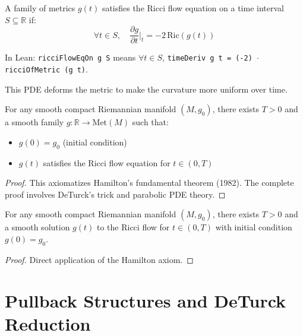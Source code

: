 \begin{definition}
\label{def:ricci_flow_eq_on}
\leanok
{}
A family of metrics $g(t)$ satisfies the Ricci flow equation on a time interval $S \subseteq \mathbb{R}$ if:
\[ \forall t \in S, \quad \frac{\partial g}{\partial t}\Big|_t = -2 \, \mathrm{Ric}(g(t)) \]

In Lean: \texttt{ricciFlowEqOn g S} means $\forall t \in S$, \texttt{timeDeriv g t = (-2) $\cdot$ ricciOfMetric (g t)}.

This PDE deforms the metric to make the curvature more uniform over time.
\end{definition}

\begin{theorem}
\label{axiom:hamilton_ste}
For any smooth compact Riemannian manifold $(M, g_0)$, there exists $T > 0$ and a smooth family $g : \mathbb{R} \to \mathrm{Met}(M)$ such that:
\begin{itemize}
\item $g(0) = g_0$ (initial condition)
\item $g(t)$ satisfies the Ricci flow equation for $t \in (0, T)$
\end{itemize}
\end{theorem}

\begin{proof}
This axiomatizes Hamilton's fundamental theorem (1982). The complete proof involves DeTurck's trick and parabolic PDE theory.
\end{proof}

\begin{theorem}
\label{thm:short_time_existence}
\leanok
{}
For any smooth compact Riemannian manifold $(M, g_0)$, there exists $T > 0$ and a smooth solution $g(t)$ to the Ricci flow for $t \in (0, T)$ with initial condition $g(0) = g_0$.
\end{theorem}

\begin{proof}
\leanok
Direct application of the Hamilton axiom.
\end{proof}

\chapter{Pullback Structures and DeTurck Reduction}
\label{chap:deturck}

